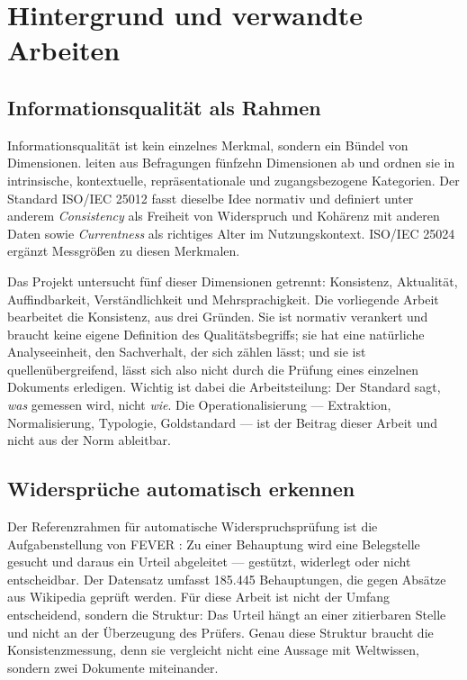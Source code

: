 
\section{Hintergrund und verwandte Arbeiten}
\label{sec:hintergrund}

\subsection{Informationsqualität als Rahmen}

Informationsqualität ist kein einzelnes Merkmal, sondern ein Bündel von Dimensionen.
\textcite{wang1996beyond} leiten aus Befragungen fünfzehn Dimensionen ab und ordnen sie in
intrinsische, kontextuelle, repräsentationale und zugangsbezogene Kategorien. Der
Standard ISO/IEC 25012 \parencite{iso25012} fasst dieselbe Idee normativ und definiert
unter anderem \emph{Consistency} als Freiheit von Widerspruch und Kohärenz mit anderen
Daten sowie \emph{Currentness} als richtiges Alter im Nutzungskontext. ISO/IEC 25024
\parencite{iso25024} ergänzt Messgrößen zu diesen Merkmalen.

Das Projekt untersucht fünf dieser Dimensionen getrennt: Konsistenz, Aktualität,
Auffindbarkeit, Verständlichkeit und Mehrsprachigkeit. Die vorliegende Arbeit bearbeitet die
Konsistenz, aus drei Gründen. Sie ist normativ verankert und braucht keine eigene Definition
des Qualitätsbegriffs; sie hat eine natürliche Analyseeinheit, den Sachverhalt, der sich
zählen lässt; und sie ist quellenübergreifend, lässt sich also nicht durch die Prüfung eines
einzelnen Dokuments erledigen. Wichtig ist dabei die Arbeitsteilung: Der Standard sagt,
\emph{was} gemessen wird, nicht \emph{wie}. Die Operationalisierung --- Extraktion,
Normalisierung, Typologie, Goldstandard --- ist der Beitrag dieser Arbeit und nicht aus der
Norm ableitbar.

\subsection{Widersprüche automatisch erkennen}

Der Referenzrahmen für automatische Widerspruchsprüfung ist die Aufgabenstellung von FEVER
\parencite{thorne2018fever}: Zu einer Behauptung wird eine Belegstelle gesucht und daraus ein
Urteil abgeleitet --- gestützt, widerlegt oder nicht entscheidbar. Der Datensatz umfasst
185.445 Behauptungen, die gegen Absätze aus Wikipedia geprüft werden. Für diese Arbeit ist
nicht der Umfang entscheidend, sondern die Struktur: Das Urteil hängt an einer zitierbaren
Stelle und nicht an der Überzeugung des Prüfers. Genau diese Struktur braucht die
Konsistenzmessung, denn sie vergleicht nicht eine Aussage mit Weltwissen, sondern zwei
Dokumente miteinander.

